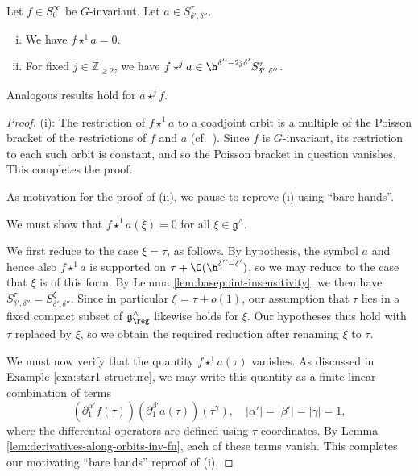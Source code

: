 \begin{lemma}\label{lem:star-j-against-invariant-function}
  Let $f \in S_0^\infty$ be $G$-invariant.  Let $a \in S^\tau_{\delta ', \delta ''}$.
  \begin{enumerate}[(i)]
  \item We have $f \star^1 a = 0$.
  \item For fixed $j \in \mathbb{Z}_{\geq 2}$, we have $f \star^j a \in \h^{\delta '' - 2 j \delta '} S_{\delta ', \delta ''}^\tau$.
  \end{enumerate}
  Analogous results hold for $a \star^j f$.
\end{lemma}
\begin{proof}
  (i): The restriction of $f \star^1 a$ to a coadjoint orbit is a multiple of the Poisson bracket of the restrictions of $f$ and $a$ (cf.\ \cite{gutt1983explicit}).  Since $f$ is $G$-invariant, its restriction to each such orbit is constant, and so the Poisson bracket in question vanishes.  This completes the proof.

  As motivation for the proof of (ii), we pause to reprove (i) using ``bare hands''.

  We must show that $f \star^1 a(\xi) = 0$ for all $\xi \in \mathfrak{g}^\wedge$.

  We first reduce to the case $\xi = \tau$, as follows.  By hypothesis, the symbol $a$ and hence also $f \star^1 a$ is supported on $\tau + \O(\h^{\delta '' - \delta '})$, so we may reduce to the case that $\xi$ is of this form.  By Lemma \ref{lem:basepoint-insensitivity}, we then have $S_{\delta ', \delta''}^\tau = S_{\delta ', \delta''}^\xi$.  Since in particular $\xi = \tau + o(1)$, our assumption that $\tau$ lies in a fixed compact subset of $\mathfrak{g}^\wedge_{\reg}$ likewise holds for $\xi$.  Our hypotheses thus hold with $\tau$ replaced by $\xi$, so we obtain the required reduction after renaming $\xi$ to $\tau$.

  We must now verify that the quantity $f \star^1 a(\tau)$ vanishes.  As discussed in Example \ref{exa:star1-structure}, we may write this quantity as a finite linear combination of terms
  \[
    \left( \partial_1^{\alpha '} f(\tau) \right) \left( \partial_1^{\beta '} a(\tau) \right) \left( \tau^\gamma \right), \quad |\alpha '| = |\beta '| = |\gamma| = 1,
  \]
  where the differential operators are defined using $\tau$-coordinates.  By Lemma \ref{lem:derivatives-along-orbits-inv-fn}, each of these terms vanish.  This completes our motivating ``bare hands'' reproof of (i).


\end{proof}
